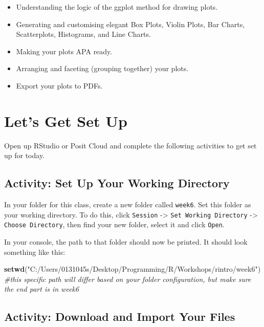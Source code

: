 \documentclass[
]{book}
\newenvironment{Shaded}{\begin{snugshade}}{\end{snugshade}}
\newcommand{\CommentTok}[1]{\textcolor[rgb]{0.56,0.35,0.01}{\textit{#1}}}
\newcommand{\FunctionTok}[1]{\textcolor[rgb]{0.13,0.29,0.53}{\textbf{#1}}}
\newcommand{\NormalTok}[1]{#1}
\newcommand{\StringTok}[1]{\textcolor[rgb]{0.31,0.60,0.02}{#1}}
\providecommand{\tightlist}{%
  \setlength{\itemsep}{0pt}\setlength{\parskip}{0pt}}
\begin{document}
\begin{itemize}
\tightlist
\item
  Understanding the logic of the ggplot method for drawing plots.
\item
  Generating and customising elegant Box Plots, Violin Plots, Bar Charts, Scatterplots, Histograms, and Line Charts.
\item
  Making your plots APA ready.
\item
  Arranging and faceting (grouping together) your plots.
\item
  Export your plots to PDFs.
\end{itemize}

\hypertarget{lets-get-set-up-2}{%
\section{Let's Get Set Up}\label{lets-get-set-up-2}}

Open up RStudio or Posit Cloud and complete the following activities to get set up for today.

\hypertarget{activity-set-up-your-working-directory}{%
\subsection{Activity: Set Up Your Working Directory}\label{activity-set-up-your-working-directory}}

In your folder for this class, create a new folder called \texttt{week6}. Set this folder as your working directory. To do this, click \texttt{Session} -\textgreater{} \texttt{Set\ Working\ Directory} -\textgreater{} \texttt{Choose\ Directory}, then find your new folder, select it and click \texttt{Open}.

In your console, the path to that folder should now be printed. It should look something like this:

\begin{Shaded}
\begin{Highlighting}[]
\FunctionTok{setwd}\NormalTok{(}\StringTok{"C:/Users/0131045s/Desktop/Programming/R/Workshops/rintro/week6"}\NormalTok{) }\CommentTok{\#this specific path will differ based on your folder configuration, but make sure the end part is in \textasciigrave{}week6\textasciigrave{}}
\end{Highlighting}
\end{Shaded}

\hypertarget{activity-download-and-import-your-files}{%
\subsection{Activity: Download and Import Your Files}\label{activity-download-and-import-your-files}}
\end{document}
